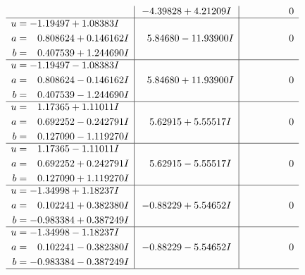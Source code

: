 \documentclass[1p]{elsarticle_modified}
\theoremstyle{definition}
\begin{document}
$$\begin{array}{c|c|c}
 & -4.39828 + 4.21209 I & \phantom{-0.000000 } 0 \\ \hline\begin{aligned}
u &= -1.19497 + 1.08383 I \\
a &= \phantom{-}0.808624 + 0.146162 I \\
b &= \phantom{-}0.407539 + 1.244690 I\end{aligned}
 & \phantom{-}5.84680 - 11.93900 I & \phantom{-0.000000 } 0 \\ \hline\begin{aligned}
u &= -1.19497 - 1.08383 I \\
a &= \phantom{-}0.808624 - 0.146162 I \\
b &= \phantom{-}0.407539 - 1.244690 I\end{aligned}
 & \phantom{-}5.84680 + 11.93900 I & \phantom{-0.000000 } 0 \\ \hline\begin{aligned}
u &= \phantom{-}1.17365 + 1.11011 I \\
a &= \phantom{-}0.692252 - 0.242791 I \\
b &= \phantom{-}0.127090 - 1.119270 I\end{aligned}
 & \phantom{-}5.62915 + 5.55517 I & \phantom{-0.000000 } 0 \\ \hline\begin{aligned}
u &= \phantom{-}1.17365 - 1.11011 I \\
a &= \phantom{-}0.692252 + 0.242791 I \\
b &= \phantom{-}0.127090 + 1.119270 I\end{aligned}
 & \phantom{-}5.62915 - 5.55517 I & \phantom{-0.000000 } 0 \\ \hline\begin{aligned}
u &= -1.34998 + 1.18237 I \\
a &= \phantom{-}0.102241 + 0.382380 I \\
b &= -0.983384 + 0.387249 I\end{aligned}
 & -0.88229 + 5.54652 I & \phantom{-0.000000 } 0 \\ \hline\begin{aligned}
u &= -1.34998 - 1.18237 I \\
a &= \phantom{-}0.102241 - 0.382380 I \\
b &= -0.983384 - 0.387249 I\end{aligned}
 & -0.88229 - 5.54652 I & \phantom{-0.000000 } 0\\
 \hline 
 \end{array}$$\newpage\newpage\renewcommand{\arraystretch}{1}
\end{document}
